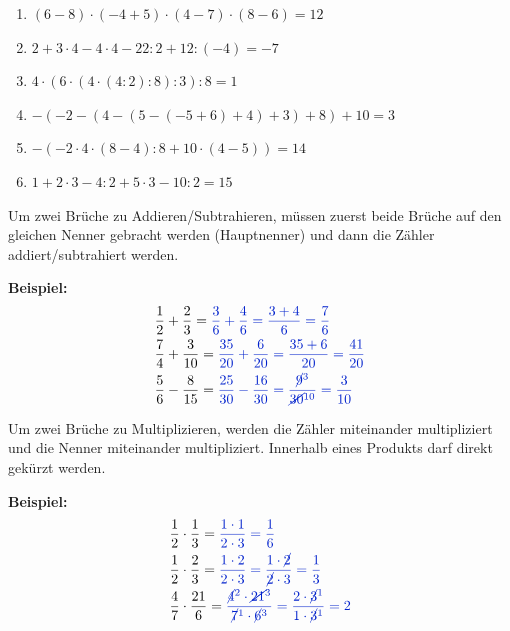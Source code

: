 \begin{Answer}[ref=einfachesRechnenA1]
\begin{minipage}{\textwidth}
\begin{minipage}{0.54\textwidth}
\begin{enumerate}[label=\alph*)]
				\item \((6-8)\cdot(-4+5)\cdot(4-7)\cdot(8-6)=12\)
				\item \(2+3\cdot 4-4\cdot 4-22:2+12:(-4)=-7\)
				\item \(4\cdot(6\cdot(4\cdot(4:2):8):3):8=1\)
				\item \(-(-2-(4-(5-(-5+6)+4)+3)+8)+10=3\)
				\item \(-(-2\cdot 4\cdot (8-4):8+10\cdot (4-5))=14\)
				\item \(1+2\cdot 3-4:2+5\cdot 3-10:2=15\)
			\end{enumerate}
		\end{minipage}%
	\end{minipage}%
\end{Answer}
\newpage
\begin{tcolorbox}
	Um zwei Brüche zu Addieren/Subtrahieren, müssen zuerst beide Brüche auf den gleichen Nenner gebracht werden (Hauptnenner) und dann die Zähler addiert/subtrahiert werden.
\end{tcolorbox}

\textbf{Beispiel:}
\begin{align*}
	&\frac{1}{2}+\frac{2}{3}=\textcolor{loes}{\frac{3}{6}+\frac{4}{6}=\frac{3+4}{6}=\frac{7}{6}}\\
	&\frac{7}{4}+\frac{3}{10}=\textcolor{loes}{\frac{35}{20}+\frac{6}{20}=\frac{35+6}{20}=\frac{41}{20}}\\
	&\frac{5}{6}-\frac{8}{15}=\textcolor{loes}{\frac{25}{30}-\frac{16}{30}=\frac{\cancel{9}^3}{\cancel{30}^{10}}=\frac{3}{10}}
\end{align*}


\begin{tcolorbox}
	Um zwei Brüche zu Multiplizieren, werden die Zähler miteinander multipliziert und die Nenner miteinander multipliziert. Innerhalb eines Produkts darf direkt gekürzt werden.
\end{tcolorbox}

\textbf{Beispiel:}
\begin{align*}
	&\frac{1}{2}\cdot\frac{1}{3}=\textcolor{loes}{\frac{1\cdot 1}{2\cdot 3}=\frac{1}{6}}\\
	&\frac{1}{2}\cdot\frac{2}{3}=\textcolor{loes}{\frac{1\cdot 2}{2\cdot 3}=\frac{1\cdot \cancel{2}}{\cancel{2}\cdot 3}=\frac{1}{3}}\\
	&\frac{4}{7}\cdot\frac{21}{6}=\textcolor{loes}{\frac{\cancel{4}^2\cdot \cancel{21}^3}{\cancel{7}^1\cdot \cancel{6}^3}=\frac{2\cdot\cancel{3}^1}{1\cdot\cancel{3}^1}=2}
\end{align*}


